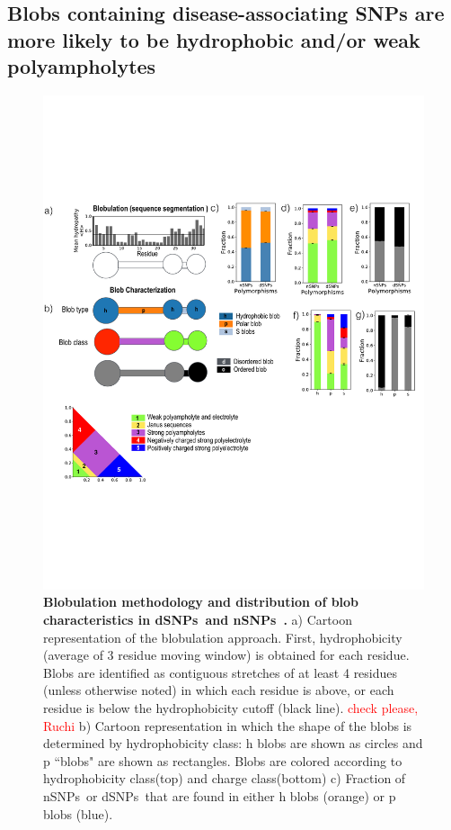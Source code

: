 \documentclass[10pt,letterpaper]{article}
\newcommand{\dSNPs}{dSNPs~}
\newcommand{\nSNPs}{nSNPs~}
\newcommand{\hydrochar}{hydrophobicity class}
\newcommand{\chargechar}{charge class}
\newcommand{\grace}[1]{\textcolor{red}{#1}}
\begin{document}
\subsection*{Blobs containing disease-associating SNPs are more likely to be hydrophobic and/or weak polyampholytes}
\begin{figure}[!ht]
\includegraphics[scale=0.1,width=\textwidth,trim={0 0cm 0 0cm},clip]{./figures/fig1.pdf}
\caption{{\bf Blobulation methodology and distribution of blob characteristics in \dSNPs  and \nSNPs.} a) 
Cartoon representation of the blobulation approach. First,  hydrophobicity (average of 3 residue moving window) is obtained for each residue. Blobs are identified as contiguous stretches of at least 4 residues (unless otherwise noted) in which each residue is above, or each residue is below the hydrophobicity cutoff (black line). \grace{check please, Ruchi} b) Cartoon representation in which the shape of the blobs is determined by \hydrochar: h blobs are shown as circles and p ``blobs" are shown as rectangles. Blobs are colored according to \hydrochar (top) and \chargechar (bottom)  c) Fraction of \nSNPs or \dSNPs that are found in either h blobs (orange) or p blobs (blue). 
}
\end{figure}
\end{document}
